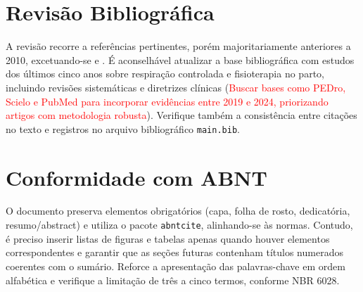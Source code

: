 \documentclass[12pt,oneside,a4paper]{article}
\begin{document}
\section*{Revisão Bibliográfica}
A revisão recorre a referências pertinentes, porém majoritariamente anteriores a 2010, excetuando-se  e \cite{sousa2021}. É aconselhável atualizar a base bibliográfica com estudos dos últimos cinco anos sobre respiração controlada e fisioterapia no parto, incluindo revisões sistemáticas e diretrizes clínicas (\textcolor{red}{Buscar bases como PEDro, Scielo e PubMed para incorporar evidências entre 2019 e 2024, priorizando artigos com metodologia robusta}). Verifique também a consistência entre citações no texto e registros no arquivo bibliográfico \texttt{main.bib}.

\section*{Conformidade com ABNT}
O documento preserva elementos obrigatórios (capa, folha de rosto, dedicatória, resumo/abstract) e utiliza o pacote \texttt{abntcite}, alinhando-se às normas. Contudo, é preciso inserir listas de figuras e tabelas apenas quando houver elementos correspondentes e garantir que as seções futuras contenham títulos numerados coerentes com o sumário. Reforce a apresentação das palavras-chave em ordem alfabética e verifique a limitação de três a cinco termos, conforme NBR 6028.



\end{document}
